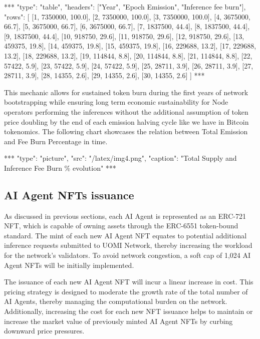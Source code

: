 \documentclass{article}
\begin{document}
\begin{center}
***
"type": "table",
"headers": ["Year", "Epoch Emission", "Inference fee burn"],
"rows": [
  [1, 7350000, 100.0],
  [2, 7350000, 100.0],
  [3, 7350000, 100.0],
  [4, 3675000, 66.7],
  [5, 3675000, 66.7],
  [6, 3675000, 66.7],
  [7, 1837500, 44.4],
  [8, 1837500, 44.4],
  [9, 1837500, 44.4],
  [10, 918750, 29.6],
  [11, 918750, 29.6],
  [12, 918750, 29.6],
  [13, 459375, 19.8],
  [14, 459375, 19.8],
  [15, 459375, 19.8],
  [16, 229688, 13.2],
  [17, 229688, 13.2],
  [18, 229688, 13.2],
  [19, 114844, 8.8],
  [20, 114844, 8.8],
  [21, 114844, 8.8],
  [22, 57422, 5.9],
  [23, 57422, 5.9],
  [24, 57422, 5.9],
  [25, 28711, 3.9],
  [26, 28711, 3.9],
  [27, 28711, 3.9],
  [28, 14355, 2.6],
  [29, 14355, 2.6],
  [30, 14355, 2.6]
]
***
\end{center}

This mechanic allows for sustained token burn during the first years of network bootstrapping while ensuring long term economic sustainability for Node operators performing the inferences without the additional assumption of token price doubling by the end of each emission halving cycle like we have in Bitcoin tokenomics. The following chart showcases the relation between Total Emission and Fee Burn Percentage in time.




***
"type": "picture",
"src": "/latex/img4.png",
"caption": "Total Supply and Inference Fee Burn \% evolution"
***


\subsection{AI Agent NFTs issuance}

As discussed in previous sections, each AI Agent is represented as an ERC-721 NFT, which is capable of owning assets through the ERC-6551 token-bound standard. The mint of each new AI Agent NFT equates to potential additional inference requests submitted to UOMI Network, thereby increasing the workload for the network's validators. To avoid network congestion, a soft cap of 1,024 AI Agent NFTs will be initially implemented.

The issuance of each new AI Agent NFT will incur a linear increase in cost. This pricing strategy is designed to moderate the growth rate of the total number of AI Agents, thereby managing the computational burden on the network. Additionally, increasing the cost for each new NFT issuance helps to maintain or increase the market value of previously minted AI Agent NFTs by curbing downward price pressures.
\end{document}
